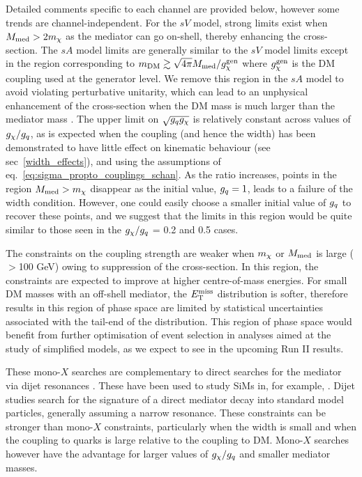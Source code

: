 Detailed comments specific to each channel are provided below, however some trends are channel-independent. For the $sV$ model, strong limits exist when $M_{\mathrm{med}} > 2 m_{\chi}$ as the mediator can go on-shell, thereby enhancing the cross-section. The $sA$ model limits are generally similar to the $sV$ model limits except in the region corresponding to $m_{\mathrm{DM}} \gtrsim \sqrt{4\pi} M_{\mathrm{med}} / g^{\rm gen}_\chi$ where $g^{\rm gen}_\chi$ is the DM coupling used at the generator level. We remove this region in the $sA$ model to avoid violating perturbative unitarity, which can lead to an unphysical enhancement of the cross-section when the DM mass is much larger than the mediator mass \cite{Chala:2015ama,Bell:2015rdw}. The upper limit on $\sqrt{g_q g_{\chi}}$ is relatively constant across values of $g_{\chi} / g_q$, as is expected when the coupling (and hence the width) has been demonstrated to have little effect on kinematic behaviour (see sec~\ref{width_effects}), and using the assumptions of eq.~\ref{eq:sigma_propto_couplings_schan}. As the ratio increases, points in the region $M_{\mathrm{med}} > m_{\chi}$ disappear as the initial value, $g_q = 1$, leads to a failure of the width condition. However, one could easily choose a smaller initial value of $g_q$ to recover these points, and we suggest that the limits in this region would be quite similar to those seen in the $g_{\chi} / g_q$ = 0.2 and 0.5 cases.

The constraints on the coupling strength are weaker when $m_{\chi}$ or $M_{\mathrm{med}}$ is large ($>$100 GeV) owing to suppression of the cross-section. In this region, the constraints are expected to improve at higher centre-of-mass energies. For small DM masses with an off-shell mediator, the $E_{\mathrm{T}}^{\mathrm{miss}}$ distribution is softer, therefore results in this region of phase space are limited by statistical uncertainties associated with the tail-end of the distribution. This region of phase space would benefit from further optimisation of event selection in analyses aimed at the study of simplified models, as we expect to see in the upcoming Run II results.

These mono-$X$ searches are complementary to direct searches for the mediator via dijet resonances \cite{Chatrchyan:2013qha, Aad:2014aqa, Aaltonen:2008dn, Khachatryan:2015sja}. These have been used to study SiMs in, for example, \cite{An:2012va,Chala:2015ama, Zurek:tchannel}. Dijet studies search for the signature of a direct mediator decay into standard model particles, generally assuming a narrow resonance. These constraints can be stronger than mono-$X$ constraints, particularly when the width is small and when the coupling to quarks is large relative to the coupling to DM. Mono-$X$ searches however have the advantage for larger values of $g_{\chi}/g_q$ and smaller mediator masses.

